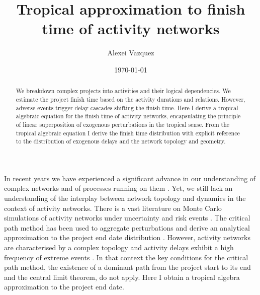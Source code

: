 \documentclass[reprint,aps,prl,amsmath,amssymb,superscriptaddress,showpacs]{revtex4-1}
\begin{document}
\title{Tropical approximation to finish time of activity networks}

\author{Alexei Vazquez}


\date{\today}

\begin{abstract}
We breakdown complex projects into activities and their logical dependencies. We estimate the
project finish time based on the activity durations and relations. However, adverse events trigger delay cascades shifting the finish time. Here I derive a tropical algebraic equation for the finish time of activity networks, encapsulating the principle of linear superposition of exogenous perturbations in the tropical sense. From the tropical algebraic equation I derive the finish time distribution with explicit reference to the distribution of exogenous delays and the network topology and geometry.
\end{abstract}

\maketitle



In recent years we have experienced a significant advance in our understanding of complex networks and of processes running on them \cite{albert02,dorogotsev08,pastor15}. Yet, we still lack an understanding of the interplay between network topology and dynamics in the context of activity networks. There is a vast literature on Monte Carlo simulations of activity networks under uncertainty and risk events \cite{acebes15,moret16}. The critical path method has been used to aggregate perturbations and derive an analytical approximation to the project end date distribution \cite{van13}. However, activity networks are characterised by a complex topology \cite{braha04,braha07,pozzana21} and activity delays exhibit a high frequency of extreme events \cite{pozzana21,araujo21,park21}. In that context the key conditions for the critical path method,  the existence of a dominant path from the project start to its end and the central limit theorem, do not apply. Here I obtain a tropical algebra approximation to the project end date.
\end{document}
